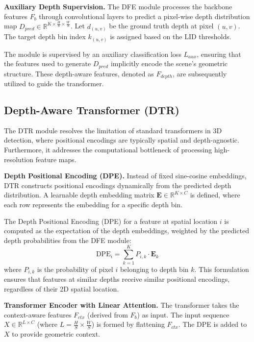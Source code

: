 \noindent\textbf{Auxiliary Depth Supervision.}
The DFE module processes the backbone features $F_b$ through convolutional layers to predict a pixel-wise depth distribution map $D_{pred} \in \mathbb{R}^{K \times \frac{H}{S} \times \frac{W}{S}}$. Let $d_{(u,v)}$ be the ground truth depth at pixel $(u,v)$. The target depth bin index $k_{(u,v)}$ is assigned based on the LID thresholds. 

The module is supervised by an auxiliary classification loss $L_{aux}$, ensuring that the features used to generate $D_{pred}$ implicitly encode the scene's geometric structure. These depth-aware features, denoted as $F_{depth}$, are subsequently utilized to guide the transformer.

\subsection{Depth-Aware Transformer (DTR)}
The DTR module resolves the limitation of standard transformers in 3D detection, where positional encodings are typically spatial and depth-agnostic. Furthermore, it addresses the computational bottleneck of processing high-resolution feature maps.

\noindent\textbf{Depth Positional Encoding (DPE).}
Instead of fixed sine-cosine embeddings, DTR constructs positional encodings dynamically from the predicted depth distribution. A learnable depth embedding matrix $\mathbf{E} \in \mathbb{R}^{K \times C}$ is defined, where each row represents the embedding for a specific depth bin.

The Depth Positional Encoding (DPE) for a feature at spatial location $i$ is computed as the expectation of the depth embeddings, weighted by the predicted depth probabilities from the DFE module:
\begin{equation}
    \text{DPE}_i = \sum_{k=1}^{K} P_{i,k} \cdot \mathbf{E}_k
\end{equation}
where $P_{i,k}$ is the probability of pixel $i$ belonging to depth bin $k$. This formulation ensures that features at similar depths receive similar positional encodings, regardless of their 2D spatial location.

\noindent\textbf{Transformer Encoder with Linear Attention.}
The transformer takes the context-aware features $F_{ctx}$ (derived from $F_b$) as input. The input sequence $X \in \mathbb{R}^{L \times C}$ (where $L = \frac{H}{S} \times \frac{W}{S}$) is formed by flattening $F_{ctx}$. The DPE is added to $X$ to provide geometric context.

